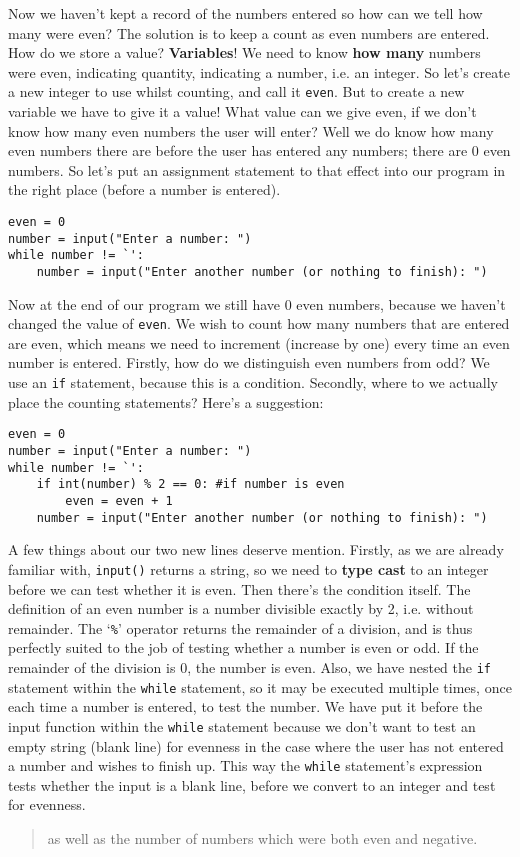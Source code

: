 Now we haven't kept a record of the numbers entered so how can we   tell how many were even? The solution is to keep a count as even   numbers are entered. How do we store a value?   \textbf{Variables}! We need to know \textbf{how many}   numbers were even, indicating quantity, indicating a number, i.e. an   integer. So let's create a new integer to use whilst counting, and call   it \texttt{even}. But to create a new variable we have to give it a value!   What value can we give even, if we don't know how many even numbers the   user will enter? Well we do know how many even numbers there are before   the user has entered any numbers; there are 0 even numbers. So let's   put an assignment statement to that effect into our program in the   right place (before a number is entered).
\begin{lstlisting}
even = 0
number = input("Enter a number: ")
while number != `':
    number = input("Enter another number (or nothing to finish): ")
\end{lstlisting}

Now at the end of our program we still have 0 even numbers, because   we haven't changed the value of \texttt{even}. We wish to count how many   numbers that are entered are even, which means we need to increment   (increase by one) every time an even number is entered. Firstly, how do   we distinguish even numbers from odd? We use an \texttt{if} statement, because   this is a condition. Secondly, where to we actually place the counting   statements? Here's a suggestion:
\begin{lstlisting}
even = 0
number = input("Enter a number: ")
while number != `':
    if int(number) % 2 == 0: #if number is even
        even = even + 1
    number = input("Enter another number (or nothing to finish): ")
\end{lstlisting}

A few things about our two new lines deserve mention. Firstly, as we   are already familiar with, \texttt{input()} returns a string, so we need to   \textbf{type cast} to an integer before we can test whether it is even. Then   there's the condition itself. The definition of an even number is a   number divisible exactly by 2, i.e. without remainder. The `\texttt{\%}' operator   returns the remainder of a division, and is thus perfectly suited to   the job of testing whether a number is even or odd. If the remainder of   the division is 0, the number is even. Also, we have nested the \texttt{if}   statement within the \texttt{while} statement, so it may be executed multiple   times, once each time a number is entered, to test the number. We have   put it before the input function within the \texttt{while}   statement because we don't want to test an empty string (blank line)   for evenness in the case where the user has not entered a number and   wishes to finish up. This way the \texttt{while} statement's expression tests   whether the input is a blank line, before we convert to an integer and   test for evenness.
\begin{quotation}    as well as the number of numbers which were both even and negative.   
\end{quotation}


